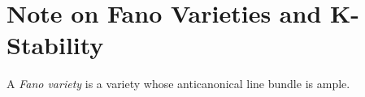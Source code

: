 \section{Note on Fano Varieties and K-Stability}

\begin{definition}
A \textit{Fano variety} is a variety whose anticanonical line bundle is ample.
\end{definition}